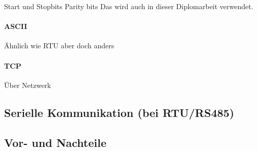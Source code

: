 Start und Stopbits
Parity bits
Das wird auch in dieser Diplomarbeit verwendet.
\paragraph{ASCII}
Ähnlich wie RTU aber doch anders
\paragraph{TCP}
Über Netzwerk

\subsection{Serielle Kommunikation (bei RTU/RS485)}



\subsection{Vor- und Nachteile}

